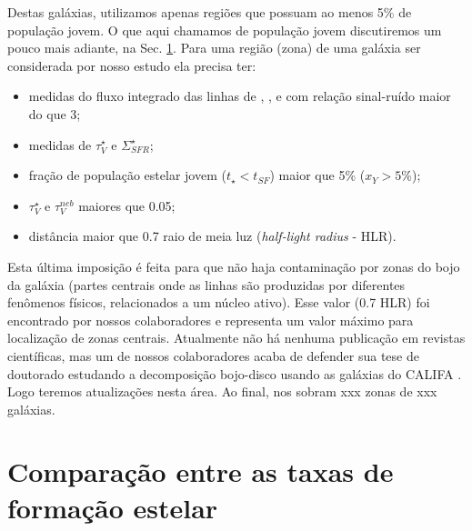 Destas galáxias, utilizamos apenas regiões que possuam ao menos 5\% de população jovem. O que
aqui chamamos de população jovem discutiremos um pouco mais adiante, na Sec. \ref{sec:synvsneb:SFR}.
Para uma região (zona) de uma galáxia ser considerada por nosso estudo ela precisa ter:
\begin{itemize}
  \item medidas do fluxo integrado das linhas de \Halpha, \Hbeta, \nII e \oIII com relação
 sinal-ruído maior do que 3;
  \item medidas de $\tau_V^\star$ e $\Sigma_{SFR}^\star$;
  \item fração de população estelar jovem ($t_\star < t_{SF}$) maior que 5\% ($x_Y > 5$\%);
  \item $\tau_V^\star$ e $\tau_V^{neb}$ maiores que 0.05;
  \item distância maior que 0.7 raio de meia luz ({\em half-light radius} - HLR).
\end{itemize}
Esta última imposição é feita para que não haja contaminação por zonas do bojo da galáxia
(partes centrais onde as linhas são produzidas por diferentes fenômenos físicos, relacionados a um
núcleo ativo). Esse valor (0.7 HLR) foi encontrado por nossos colaboradores e representa um valor
máximo para localização de zonas centrais. Atualmente não há nenhuma publicação em revistas
científicas, mas um de nossos colaboradores acaba de defender sua tese de doutorado estudando a
decomposição bojo-disco usando as galáxias do CALIFA . Logo teremos atualizações
nesta área. \ojo Ao final, nos sobram xxx zonas de xxx galáxias.

\section{Comparação entre as taxas de formação estelar}
\label{sec:synvsneb:SFR}

